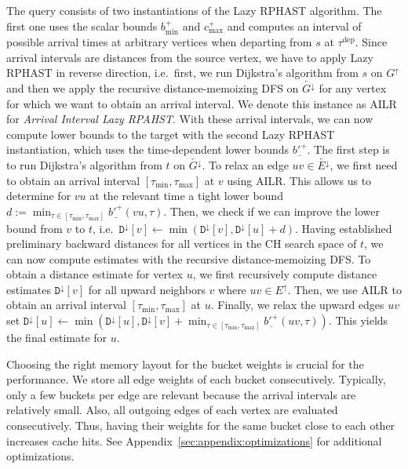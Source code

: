 \documentclass[a4paper,UKenglish,cleveref, autoref, thm-restate,anonymous]{lipics-v2021}
\newcommand*{\comb}{c}
\newcommand*{\tdep}{\tau^{\operatorname{dep}}}
\newcommand*{\gchu}{G^{\uparrow}}
\newcommand*{\gchd}{\overleftarrow{G^{\downarrow}}}
\newcommand*{\echu}{E^{\uparrow}}
\newcommand*{\rechd}{\overleftarrow{E^{\downarrow}}}
\newcommand*{\pcfn}{\underline{b'^+}}
\begin{document}
The query consists of two instantiations of the Lazy RPHAST algorithm.
The first one uses the scalar bounds $b^+_{\min}$ and $\comb^+_{\max}$ and computes an interval of possible arrival times at arbitrary vertices when departing from $s$ at $\tdep$.
Since arrival intervals are distances from the source vertex, we have to apply Lazy RPHAST in reverse direction, i.e.\ first, we run Dijkstra's algorithm from $s$ on $\gchu$ and then we apply the recursive distance-memoizing DFS on $\gchd$ for any vertex for which we want to obtain an arrival interval.
We denote this instance as AILR for \emph{Arrival Interval Lazy RPAHST}.
With these arrival intervals, we can now compute lower bounds to the target with the second Lazy RPHAST instantiation, which uses the time-dependent lower bounds $\pcfn$.
The first step is to run Dijkstra's algorithm from $t$ on $\gchd$.
To relax an edge $uv \in \rechd$, we first need to obtain an arrival interval $[\tau_{\min}, \tau_{\max}]$ at $v$ using AILR.
This allows us to determine for $vu$ at the relevant time a tight lower bound $d := \min_{\tau \in [\tau_{\min}, \tau_{\max}]} \pcfn(vu, \tau)$.
Then, we check if we can improve the lower bound from $v$ to $t$, i.e.\ $\mathtt{D}^{\downarrow}[v] \leftarrow \min(\mathtt{D}^{\downarrow}[v], \mathtt{D}^{\downarrow}[u] + d)$.
Having established preliminary backward distances for all vertices in the CH search space of $t$, we can now compute estimates with the recursive distance-memoizing DFS.
To obtain a distance estimate for vertex $u$, we first recursively compute distance estimates $\mathtt{D}^{\downarrow}[v]$ for all upward neighbors $v$ where $uv \in \echu$.
Then, we use AILR to obtain an arrival interval $[\tau_{\min}, \tau_{\max}]$ at $u$.
Finally, we relax the upward edges $uv$ set $\mathtt{D}^{\downarrow}[u] \leftarrow \min(\mathtt{D}^{\downarrow}[u], \mathtt{D}^{\downarrow}[v] + \min_{\tau \in [\tau_{\min}, \tau_{\max}]} \pcfn(uv, \tau))$.
This yields the final estimate for $u$.

Choosing the right memory layout for the bucket weights is crucial for the performance.
We store all edge weights of each bucket consecutively.
Typically, only a few buckets per edge are relevant because the arrival intervals are relatively small.
Also, all outgoing edges of each vertex are evaluated consecutively.
Thus, having their weights for the same bucket close to each other increases cache hits.
See Appendix~\ref{sec:appendix:optimizations} for additional optimizations.
\end{document}
